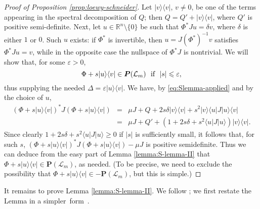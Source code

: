 \documentclass[10pt]{article}
\newcommand{\e}{\varepsilon}
\DeclareMathOperator{\tr}{Tr}
\DeclareMathOperator{\I}{Id}
\renewcommand{\leq}{\leqslant}
\renewcommand{\geq}{\geqslant}
\def\tcr{\textcolor{red}}
\newcommand{\LP}{\cP(\mathcal{L}_m)}
\newcommand{\cP}{\bm{P}}
\newcommand{\R}{\mathbb{R}}
\newcommand{\Rp}{\mathbb{R}_+}
\newcommand{\ketbra}[2]{| #1 \rangle \langle #2 |}
\newcommand{\bra}[1]{\langle #1 |}
\newcommand{\ket}[1]{| #1 \rangle}
\theoremstyle{plain}
\theoremstyle{definition}
\theoremstyle{remark}
\begin{document}
\begin{proof} [Proof of Proposition \ref{prop:loewy-schneider}]
Let $\ketbra{v}{v}$, $v\neq 0$,  be one of the terms appearing in the spectral decomposition of $Q$; 
then  $Q = Q' + \ketbra{v}{v}$, where $Q'$ is positive semi-definite. 
Next,  let  $u\in \R^n\setminus \{0\}$ be such that $\Phi^* J u = \delta v$, where $\delta$ is either $1$ or $0$. 
Such $u$ exists: if $\Phi^*$ is invertible, then  $u=J(\Phi^*)^{-1}v$  satisfies $\Phi^* J u = v$, 
while in the opposite case the nullspace of $\Phi^* J$ is nontrivial. 
We will show that, for  some $\e >0$, 
\begin{equation} \label{eq:Delta} 
\Phi + s \ketbra{u}{v} \in \LP \ \hbox{ if } \ |s| \leq \e ,
\end{equation} 
thus supplying the needed $\Delta = \e \ketbra{u}{v}$.  We have, by \eqref{eq:Slemma-applied} and by the choice of $u$, 
\begin{eqnarray} \label{eq:perturbation}
(\Phi + s\ketbra{u}{v})^* J (\Phi + s\ketbra{u}{v}) &=& \mu J +Q+ 2s\delta \ketbra{v}{v} +s^2 \ketbra{v}{u} J \ketbra{u}{v} 
\nonumber \\
&=& \mu J +Q'+(1+2s\delta +s^2 \bra{u}J\ket{u}) \ketbra{v}{v} .
\end{eqnarray}  
Since clearly $1+2s\delta +s^2 \bra{u}J\ket{u} \geq 0$ if $|s|$ is sufficiently small, it 
follows that, for such $s$,  $(\Phi + s\ketbra{u}{v})^* J (\Phi + s\ketbra{u}{v}) - \mu J$ is positive semidefinite. 
Thus we can deduce from the easy part of Lemma \ref{lemma:S-lemma-II} that $\Phi + s\ketbra{u}{v} \in \LP$, as needed. 
(To be precise, we need to exclude the possibility that $\Phi + s\ketbra{u}{v} \in -\LP$, 
but this is simple.)  
%
\end{proof}
It remains to prove Lemma \ref{lemma:S-lemma-II}.  {We follow \cite{PolikTerlaky07};   
we first restate the Lemma in a simpler~form~\cite{Yuan90}.}
 
\end{document}
